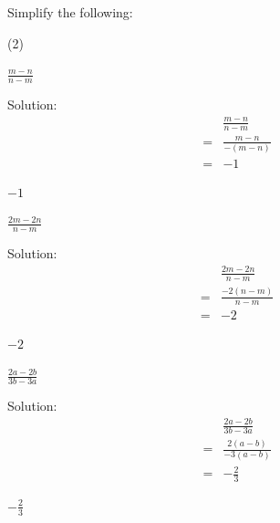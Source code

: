 \noindent%
Simplify the following:
\begin{mtask}[resume](2) 
   \task \begin{exercise} $\frac{m-n}{n-m}$
              \begin{envSolution}[equal height group=grp-10-Alebra]
			      Solution:
			      \begin{align*}
			         & \frac{m-n}{n-m}                      \\
					=& \frac{m-n}{-(m-n)}                   \\
                    =& -1                          
				 \end{align*}
                 \begin{shortsolution}  
				       $-1$
                 \end{shortsolution}
               \end{envSolution}
         \end{exercise}

   \task \begin{exercise} $\frac{2m-2n}{n-m}$
              \begin{envSolution}[equal height group=grp-10-Alebra]
			      Solution:
			      \begin{align*}
			         & \frac{2m-2n}{n-m}                    \\
					=& \frac{-2(n-m)}{n-m}                  \\
                    =& -2
				 \end{align*}
                 \begin{shortsolution}  
				       $-2$
                 \end{shortsolution}
               \end{envSolution}
         \end{exercise}
   \task \begin{exercise} $\frac{2a-2b}{3b-3a}$
              \begin{envSolution}[equal height group=grp-10-Alebra]
			      Solution:
			      \begin{align*}
			         & \frac{2a-2b}{3b-3a}                   \\
					=&\frac{2(a-b)}{-3(a-b)}                 \\
                    =& -\frac{2}{3}                           
				 \end{align*}
                 \begin{shortsolution}  
				       $-\frac{2}{3}$
                 \end{shortsolution}
               \end{envSolution}
         \end{exercise}


\end{mtask}
